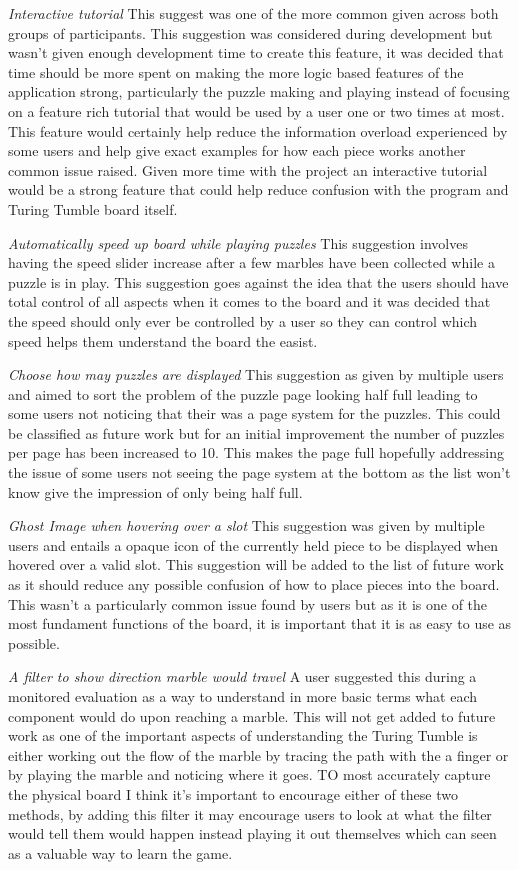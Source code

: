 \documentclass{l4proj}
\begin{document}
\emph{Interactive tutorial}
This suggest was one of the more common given across both groups of participants. This suggestion was considered during development but wasn't given enough development time to create this feature, it was decided that time should be more spent on making the more logic based features of the application strong, particularly the puzzle making and playing instead of focusing on a feature rich tutorial that would be used by a user one or two times at most. This feature would certainly help reduce the information overload experienced by some users and help give exact examples for how each piece works another common issue raised. Given more time with the project an interactive tutorial would be a strong feature that could help reduce confusion with the program and Turing Tumble board itself. 

\emph{Automatically speed up board while playing puzzles}
This suggestion involves having the speed slider increase after a few marbles have been collected while a puzzle is in play. This suggestion goes against the idea that the users should have total control of all aspects when it comes to the board and it was decided that the speed should only ever be controlled by a user so they can control which speed helps them understand the board the easist.

\emph{Choose how may puzzles are displayed}
This suggestion as given by multiple users and aimed to sort the problem of the puzzle page looking half full leading to some users not noticing that their was a page system for the puzzles. This could be classified as future work but for an initial improvement the number of puzzles per page has been increased to 10. This makes the page full hopefully addressing the issue of some users not seeing the page system at the bottom as the list won't know give the impression of only being half full.

\emph{Ghost Image when hovering over a slot}
This suggestion was given by multiple users and entails a opaque icon of the currently held piece to be displayed when hovered over a valid slot. This suggestion will be added to the list of future work as it should reduce any possible confusion of how to place pieces into the board. This wasn't a particularly common issue found by users but as it is one of the most fundament functions of the board, it is important that it is as easy to use as possible.

\emph{A filter to show direction marble would travel}
A user suggested this during a monitored evaluation as a way to understand in more basic terms what each component would do upon reaching a marble. This will not get added to future work as one of the important aspects of understanding the Turing Tumble is either working out the flow of the marble by tracing the path with the a finger or by playing the marble and noticing where it goes. TO most accurately capture the physical board I think it's important to encourage either of these two methods, by adding this filter it may encourage users to look at what the filter would tell them would happen instead playing it out themselves which can seen as a valuable way to learn the game.
\end{document}
